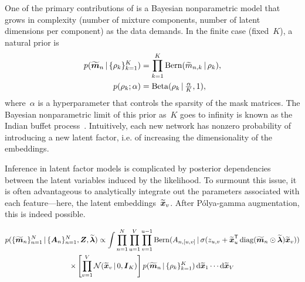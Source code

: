 One of the primary contributions of \citet{durante2016nonparametric}
is a Bayesian nonparametric model that grows in complexity (number of
mixture components, number of latent dimensions per component) as the
data demands. In the finite case (fixed~$K$), a natural prior is
\begin{align}
  p(\widetilde{\boldsymbol{m}}_n \, | \, \{\rho_k\}_{k=1}^K)
  &=\prod_{k=1}^K \mathrm{Bern}(\widetilde{m}_{n,k} \, | \, \rho_k), \\
  p(\rho_k; \alpha) &= \mathrm{Beta}(\rho_k \, | \, \tfrac{\alpha}{K}, 1), 
\end{align}
where~$\alpha$ is a hyperparameter that controls the sparsity of the
mask matrices. The Bayesian nonparametric limit of this prior as~$K$
goes to infinity is known as the Indian buffet
process~\citep{griffiths2005infinite}.  Intuitively, each new network
has nonzero probability of introducing a new latent factor, i.e. of
increasing the dimensionality of the embeddings.

Inference in latent factor models is complicated by posterior dependencies
between the latent variables induced by the likelihood.  To surmount
this issue, it is often advantageous to analytically integrate out
the parameters associated with each feature---here, the latent
embeddings~$\widetilde{\boldsymbol{x}}_v$. After P\'{o}lya-gamma augmentation,
this is indeed possible.


\begin{multline}
  p(\{\widetilde{\boldsymbol{m}}_n\}_{n=1}^N \, | \, \{\boldsymbol{A}_n\}_{n=1}^N, \boldsymbol{Z}, \widetilde{\boldsymbol{\lambda}})
  \propto \int \prod_{n=1}^N \prod_{u=1}^V \prod_{v=1}^{u-1}
    \mathrm{Bern}(A_{n,[u,v]} \, | \, \sigma( z_{u,v} + \widetilde{\boldsymbol{x}}_u^{\mathsf{T}}
    \operatorname{diag}(\widetilde{\boldsymbol{m}}_n \odot \widetilde{\boldsymbol{\lambda}}) \widetilde{\boldsymbol{x}}_v)) \\
    \times \left[ \prod_{v=1}^V \mathcal{N}(\widetilde{\boldsymbol{x}}_v \, | \, 0, \boldsymbol{I}_K) \right]
    p(\widetilde{\boldsymbol{m}}_n \, | \, \{\rho_k\}_{k=1}^K)
    \mathop{}\!\mathrm{d} \widetilde{\boldsymbol{x}}_1 \cdots \mathop{}\!\mathrm{d} \widetilde{\boldsymbol{x}}_V
\end{multline}














































